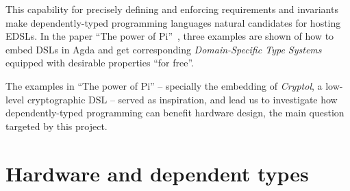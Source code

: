             This capability for precisely defining and enforcing requirements and invariants make
            dependently-typed programming languages natural candidates for hosting \acp{EDSL}.
            In the paper ``The power of Pi''~\cite{power-pi}, three examples are shown of how to
            embed \acp{DSL} in Agda and get corresponding \emph{Domain-Specific Type Systems}
            equipped with desirable properties ``for free''.

            The examples in ``The power of Pi'' -- specially the embedding of \emph{Cryptol},
            a low-level cryptographic \ac{DSL} -- served as inspiration,
            and lead us to investigate how dependently-typed programming can benefit hardware
            design, the main question targeted by this project.



    \section{Hardware and dependent types}
    \label{sec:hardware-dtp}


